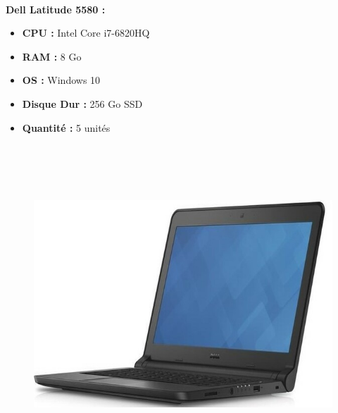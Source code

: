\documentclass[11pt,a4paper,oneside]{article}
\begin{document}
\paragraph{}\textbf{Dell Latitude 5580 :} \\
\begin{itemize}
\item \textbf{CPU :} Intel Core i7-6820HQ
\item \textbf{RAM :} 8 Go
\item \textbf{OS :} Windows 10
\item \textbf{Disque Dur :} 256 Go SSD
\item \textbf{Quantité :} 5 unités
\\ \\ \\ \\ \\
\end{itemize}
\begin{figure}
\includegraphics[scale=0.4]{Ressources/Materiel/L3340.jpg}\vspace{-2cm}
\end{figure}
\end{document}
